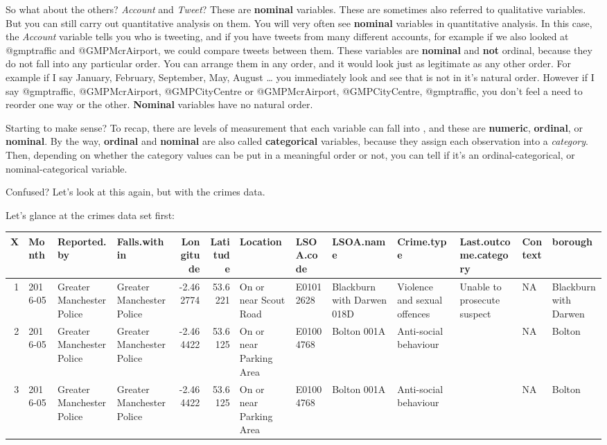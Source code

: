 \documentclass[]{book}
\theoremstyle{definition}
\theoremstyle{definition}
\theoremstyle{definition}
\theoremstyle{remark}
\begin{document}
So what about the others? \emph{Account} and \emph{Tweet}? These are
\textbf{nominal} variables. These are sometimes also referred to
qualitative variables. But you can still carry out quantitative analysis
on them. You will very often see \textbf{nominal} variables in
quantitative analysis. In this case, the \emph{Account} variable tells
you who is tweeting, and if you have tweets from many different
accounts, for example if we also looked at @gmptraffic and
@GMPMcrAirport, we could compare tweets between them. These variables
are \textbf{nominal} and \textbf{not} ordinal, because they do not fall
into any particular order. You can arrange them in any order, and it
would look just as legitimate as any other order. For example if I say
January, February, September, May, August \ldots{} you immediately look
and see that is not in it's natural order. However if I say @gmptraffic,
@GMPMcrAirport, @GMPCityCentre or @GMPMcrAirport, @GMPCityCentre,
@gmptraffic, you don't feel a need to reorder one way or the other.
\textbf{Nominal} variables have no natural order.

Starting to make sense? To recap, there are levels of measurement that
each variable can fall into , and these are \textbf{numeric},
\textbf{ordinal}, or \textbf{nominal}. By the way, \textbf{ordinal} and
\textbf{nominal} are also called \textbf{categorical} variables, because
they assign each observation into a \emph{category}. Then, depending on
whether the category values can be put in a meaningful order or not, you
can tell if it's an ordinal-categorical, or nominal-categorical
variable.

Confused? Let's look at this again, but with the crimes data.

Let's glance at the crimes data set first:

\begin{tabular}{r|l|l|l|r|r|l|l|l|l|l|l|l}
\hline
X & Month & Reported.by & Falls.within & Longitude & Latitude & Location & LSOA.code & LSOA.name & Crime.type & Last.outcome.category & Context & borough\\
\hline
1 & 2016-05 & Greater Manchester Police & Greater Manchester Police & -2.462774 & 53.6221 & On or near Scout Road & E01012628 & Blackburn with Darwen 018D & Violence and sexual offences & Unable to prosecute suspect & NA & Blackburn with Darwen\\
\hline
2 & 2016-05 & Greater Manchester Police & Greater Manchester Police & -2.464422 & 53.6125 & On or near Parking Area & E01004768 & Bolton 001A & Anti-social behaviour &  & NA & Bolton\\
\hline
3 & 2016-05 & Greater Manchester Police & Greater Manchester Police & -2.464422 & 53.6125 & On or near Parking Area & E01004768 & Bolton 001A & Anti-social behaviour &  & NA & Bolton\\
\hline
\end{tabular}
\end{document}
